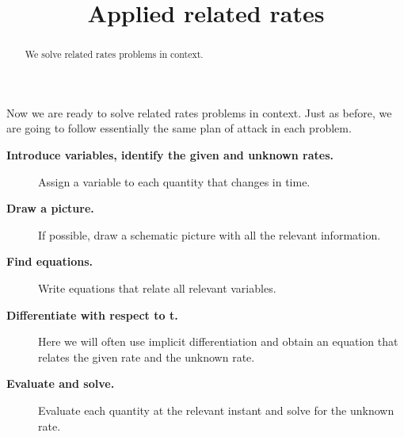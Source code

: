 \documentclass{ximera}
\title[Dig-In:]{Applied related rates}
\begin{document}
\begin{abstract}
  We solve related rates problems in context.
\end{abstract}
\maketitle

Now we are ready to solve related rates problems in context. Just as
before, we are going to follow essentially the same plan of attack in
each problem.


\begin{description}
\item[\textbf{Introduce variables, identify the given and unknown rates.}] Assign a variable to each quantity that changes in time.
\item[\textbf{Draw a picture.}] If possible, draw a schematic picture with all the relevant information. 
\item[\textbf{Find equations.}] Write equations that relate all
  relevant variables.
\item[\textbf{Differentiate with respect to t.}] Here we will often use
  implicit differentiation and obtain an equation that relates the given rate and the unknown rate. 
\item[\textbf{Evaluate and solve.}] Evaluate
each quantity at the relevant instant and solve for the unknown rate.

\end{description}
\end{document}
